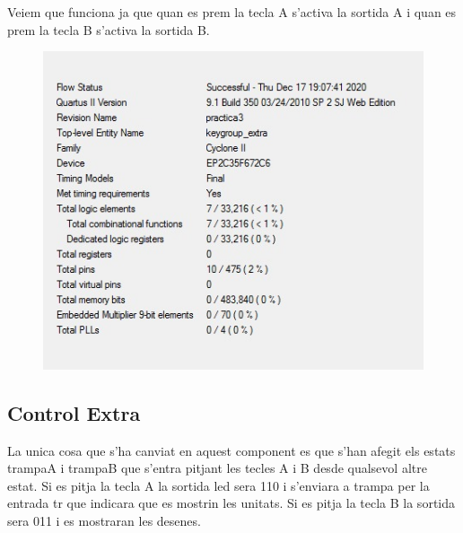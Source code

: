 \documentclass[12pt, a4papre]{article}
\begin{document}
	Veiem que funciona ja que quan es prem la tecla A s'activa la sortida A i quan es prem la tecla B s'activa la sortida B.
		\begin{figure}[H]
			
				\begin{center}
		\includegraphics[width=130mm]{informeKeyGroupExtra.jpeg}
		\end{center}
	\end{figure}	
			
			
\subsection{Control Extra}

La unica cosa que s'ha canviat en aquest component es que s'han afegit els estats trampaA i trampaB que s'entra pitjant les tecles A i B desde qualsevol altre estat. Si es pitja la tecla A la sortida led sera 110 i s'enviara a trampa per la entrada tr que indicara que es mostrin les unitats. Si es pitja la tecla B la sortida sera 011 i es mostraran les desenes.
\end{document}
